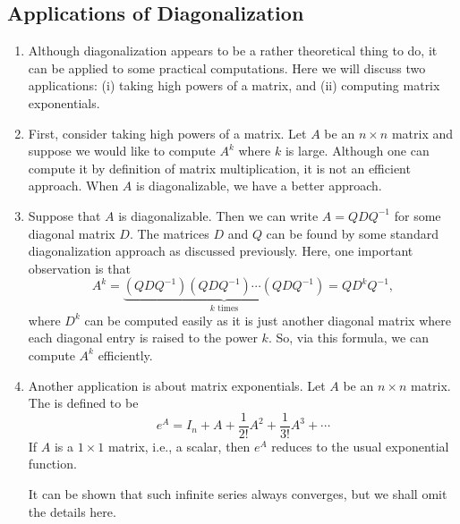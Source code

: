 \subsection{Applications of Diagonalization}
\begin{enumerate}
\item Although diagonalization appears to be a rather theoretical thing to do,
it can be applied to some practical computations. Here we will discuss two
applications: (i) taking high powers of a matrix, and (ii) computing matrix
exponentials.

\item First, consider taking high powers of a matrix. Let \(A\) be an \(n\times
n\) matrix and suppose we would like to compute \(A^k\) where \(k\) is large.
Although one can compute it by definition of matrix multiplication, it is not
an efficient approach. When \(A\) is diagonalizable, we have a better approach.

\item \label{it:cpt-high-matx-pow-diag} Suppose that \(A\) is diagonalizable.
Then we can write \(A=QDQ^{-1}\) for some diagonal matrix \(D\). The matrices
\(D\) and \(Q\) can be found by some standard diagonalization approach as
discussed previously. Here, one important observation is that
\[
A^k=\underbrace{(QDQ^{-1})(QDQ^{-1})\cdots(QDQ^{-1})}_{\text{\(k\) times}}
=QD^kQ^{-1},
\]
where \(D^k\) can be computed easily as it is just another diagonal matrix
where each diagonal entry is raised to the power \(k\). So, via this formula,
we can compute \(A^k\) efficiently.

\item Another application is about matrix exponentials. Let \(A\) be an
\(n\times n\) matrix. The  is defined to be
\[
e^A=I_n+A+\frac{1}{2!}A^2+\frac{1}{3!}A^3+\dotsb
\]
If \(A\) is a \(1\times 1\) matrix, i.e., a scalar, then \(e^A\) reduces to the
usual exponential function.

\begin{note}
It can be shown that such infinite series always converges, but we shall omit
the details here.
\end{note}


\end{enumerate}
